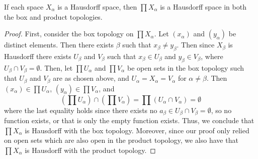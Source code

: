\documentclass[12pt, a4paper, oneside, openright, titlepage]{book}
\begin{document}
\begin{thm}
    If each space $X_{\alpha}$ is a Hausdorff space, then $\prod X_{\alpha}$ is a Hausdorff space in both the box and product topologies.
\end{thm}
\begin{proof}
    First, consider the box topology on $\prod X_{\alpha}$. Let $(x_{\alpha})$ and $(y_{\alpha})$ be distinct elements. Then there exists $\beta$ such that $x_{\beta} \neq y_{\beta}$. Then since $X_{\beta}$ is Hausdorff there exists $U_{\beta}$ and $V_{\beta}$ such that $x_{\beta} \in U_{\beta}$ and $y_{\beta} \in V_{\beta}$, where $U_{\beta}\cap V_{\beta} = \emptyset$. Then, let $\prod U_{\alpha}$ and $\prod V_{\alpha}$ be open sets in the box topology such that $U_{\beta}$ and $V_{\beta}$ are as chosen above, and $U_{\alpha} = X_{\alpha} = V_{\alpha}$ for $\alpha \neq \beta$. Then $(x_{\alpha}) \in \prod U_{\alpha}$, $(y_{\alpha}) \in \prod V_{\alpha}$, and \begin{equation*}
        \left(\prod U_{\alpha}\right)\cap \left(\prod V_{\alpha}\right) = \prod (U_{\alpha}\cap V_{\alpha}) = \emptyset
    \end{equation*}
    where the last equality holds since there exists no $a_{\beta} \in U_{\beta}\cap V_{\beta} = \emptyset$, so no function exists, or that is only the empty function exists. Thus, we conclude that $\prod X_{\alpha}$ is Hausdorff with the box topology. Moreover, since our proof only relied on open sets which are also open in the product topology, we also have that $\prod X_{\alpha}$ is Hausdorff with the product topology.
\end{proof}
\end{document}
